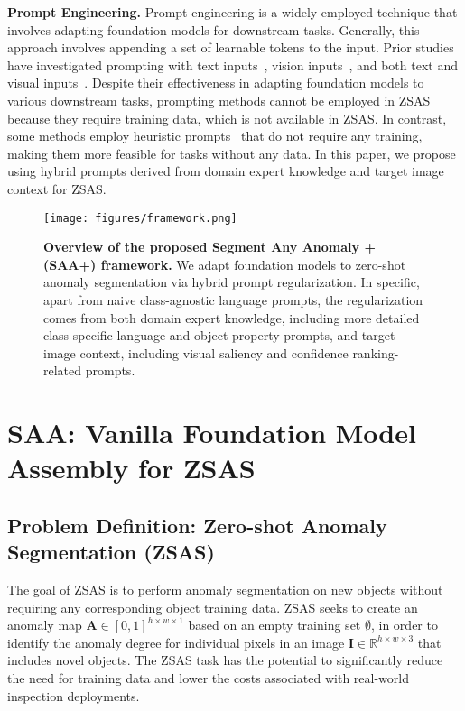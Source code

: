 \noindent\textbf{Prompt Engineering. } 
Prompt engineering is a widely employed technique that involves adapting foundation models for downstream tasks. Generally, this approach involves appending a set of learnable tokens to the input.  Prior studies have investigated prompting with text inputs~\cite{zhou_conditional}, vision inputs~\cite{ju_prompting_2022, jia_visual_2022, bahng_exploring_2022}, and both text and visual inputs~\cite{zang_unified_2022, shen_multitask_2022, zhou_learning_2022}. Despite their effectiveness in adapting foundation models to various downstream tasks, prompting methods cannot be employed in ZSAS because they require training data, which is not available in ZSAS. In contrast, some methods employ heuristic prompts~\cite{shtedritski_what_2023} that do not require any training, making them more feasible for tasks without any data. In this paper, we propose using hybrid prompts derived from domain expert knowledge and target image context for ZSAS. 

\begin{figure*}[!t]
  \centering
  \texttt{[image: figures/framework.png]}
  \vspace{-0.15in}
  \caption{\textbf{Overview of the proposed Segment Any Anomaly + (SAA+) framework.} We adapt foundation models to zero-shot anomaly segmentation via hybrid prompt regularization. In specific, apart from naive class-agnostic language prompts, the regularization comes from both domain expert knowledge, including more detailed class-specific language and object property prompts, and target image context, including visual saliency and confidence ranking-related prompts.
  }  
  \label{fig:framework}
  
\end{figure*}

\section{SAA: Vanilla Foundation Model Assembly for ZSAS}

\subsection{Problem Definition: Zero-shot Anomaly Segmentation (ZSAS)}

The goal of ZSAS is to perform anomaly segmentation on new objects without requiring any corresponding object training data. ZSAS seeks to create an anomaly map $\mathbf{A} \in [0,1]^{h \times w \times 1}$ based on an empty training set $\emptyset$, in order to identify the anomaly degree for individual pixels in an image $\mathbf{I} \in \mathbb{R}^{h \times w \times 3}$ that includes novel objects. The ZSAS task has the potential to significantly reduce the need for training data and lower the costs associated with real-world inspection deployments.

